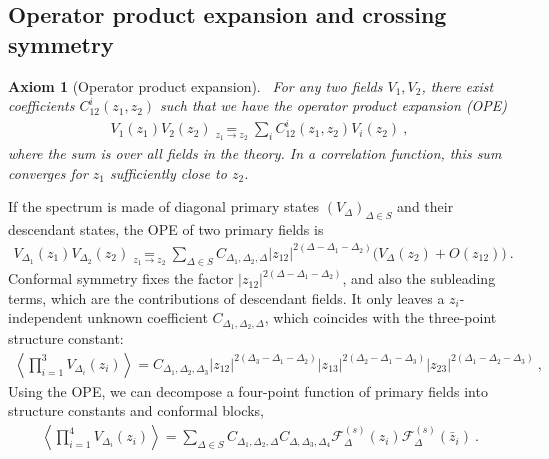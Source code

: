 \documentclass[12pt, a4paper]{article}
\theoremstyle{break}
\newtheorem{hyp}[exo]{Axiom}
\begin{document}
\subsection{Operator product expansion and crossing symmetry}

\begin{hyp}[Operator product expansion]
 ~\label{hyp:ope}
 For any two fields $V_1,V_2$, there exist coefficients $C^i_{12}(z_1,z_2)$ such that we have the operator product expansion (OPE) 
 \begin{align}
  V_{1}(z_1)V_{2}(z_2) \underset{z_1\to z_2}{=} \sum_i C^i_{12}(z_1,z_2) V_{i}(z_2)\ ,
 \end{align}
 where the sum is over all fields in the theory.
 In a correlation function,
 this sum converges for $z_1$ sufficiently close to $z_2$.
\end{hyp}

If the spectrum is made of diagonal primary states $(V_\Delta)_{\Delta\in S}$ and their descendant states, the OPE of two primary fields is
\begin{align}
 V_{\Delta_1}(z_1) V_{\Delta_2}(z_2) 
\underset{z_1\to z_2}{=} \sum_{\Delta\in S} C_{\Delta_1,\Delta_2,\Delta} |z_{12}|^{2(\Delta-\Delta_1-\Delta_2)}
 \Big(V_{\Delta}(z_2) + O(z_{12}) \Big)\ .
 \label{eq:ope}
\end{align}
Conformal symmetry fixes the factor $|z_{12}|^{2(\Delta-\Delta_1-\Delta_2)}$, and also the subleading terms, which are the contributions of descendant fields. It only leaves a $z_i$-independent unknown coefficient $C_{\Delta_1,\Delta_2,\Delta}$, which coincides with the three-point structure constant:
\begin{align}
 \left<\prod_{i=1}^3 V_{\Delta_i}(z_i) \right> = C_{\Delta_1,\Delta_2,\Delta_3} |z_{12}|^{2(\Delta_3-\Delta_1-\Delta_2)} |z_{13}|^{2(\Delta_2-\Delta_1-\Delta_3)} |z_{23}|^{2(\Delta_1-\Delta_2-\Delta_3)}\ ,
\end{align}
Using the OPE, we can decompose a four-point function of primary fields into structure constants and conformal blocks,
\begin{align}
\left<\prod_{i=1}^4 V_{\Delta_i}(z_i)\right>
 =\sum_{\Delta\in S} C_{\Delta_1,\Delta_2,\Delta} C_{\Delta,\Delta_3,\Delta_4}  \mathcal{F}^{(s)}_\Delta(z_i) \mathcal{F}^{(s)}_\Delta(\bar z_i)\ .
 \label{sdec}
\end{align}
\end{document}
